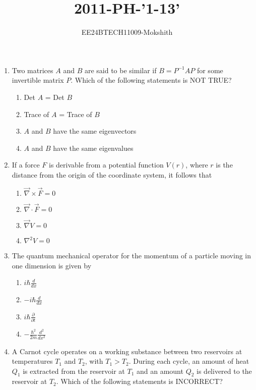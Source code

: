 \documentclass[journal]{IEEEtran}
\begin{document}

\title{2011-PH-'1-13'}
\author{EE24BTECH11009-Mokshith}
{\let\newpage\relax\maketitle}
\renewcommand{\thefigure}{\theenumi}
\renewcommand{\thetable}{\theenumi}
\setlength{\intextsep}{10pt} %
\renewcommand{\thetable}{\theenumi
}
\begin{enumerate}
\item Two matrices $A$ and $B$ are said to be similar if $B = P^{-1}AP$ for some invertible matrix $P$. Which of the following statements is NOT TRUE?
\begin{enumerate}
    \item Det $A$ = Det $B$
    \item Trace of $A$ = Trace of $B$
    \item $A$ and $B$ have the same eigenvectors
    \item $A$ and $B$ have the same eigenvalues
    \end{enumerate}
\item If a force $F$ is derivable from a potential function $V(r)$, where $r$ is the distance from the origin of the coordinate system, it follows that
\begin{enumerate}
    \item $\overrightarrow{\nabla} \times \overrightarrow{F} = 0$
    \item $\overrightarrow{\nabla} \cdot \overrightarrow{F} = 0$
    \item $\overrightarrow{\nabla} V = 0$
    \item $\nabla^2 V = 0$
\end{enumerate}
\item The quantum mechanical operator for the momentum of a particle moving in one dimension is given by
\begin{enumerate}
    \item $i\hbar\frac{d}{dx}$
    \item $-i\hbar\frac{d}{dx}$
    \item $i\hbar\frac{\partial}{\partial t}$
    \item $-\frac{\hbar^2}{2m}\frac{d^2}{dx^2}$
\end{enumerate}
\item A Carnot cycle operates on a working substance between two reservoirs at temperatures $T_1$ and $T_2$, with $T_1 > T_2$. During each cycle, an amount of heat $Q_1$ is extracted from the reservoir at $T_1$ and an amount $Q_2$ is delivered to the reservoir at $T_2$. Which of the following statements is INCORRECT?

\end{enumerate}
\end{document}
